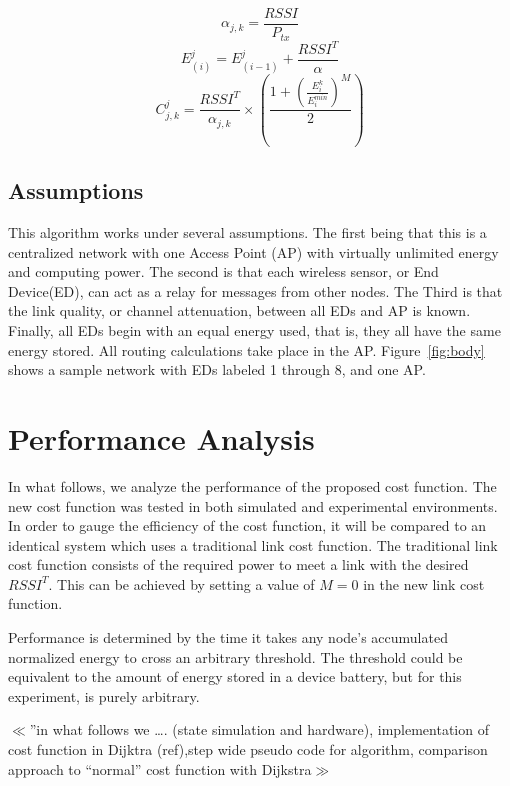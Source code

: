 \documentclass{article}
\begin{document}
\begin{equation}
\label{eqn:alpha}
\alpha_{j,k} = \frac{RSSI}{P_{tx}}
\end{equation}
\begin{equation}
\label{eqn:accumulated_energy}
E^j_{(i)} = E^j_{(i-1)} + \frac{RSSI^T}{\alpha}
\end{equation}
\begin{equation}
\label{eqn:link_cost}
C^j_{j,k} = \frac{RSSI^T}{\alpha_{j,k}} \times \left( \frac{1+\left(\frac{E^k_i}{E^{min}_{i}} \right)^M}{2} \right)
\end{equation}

\subsection{Assumptions}
This algorithm works under several assumptions. The first being that this is a centralized network with one Access Point (AP) with virtually unlimited energy and computing power. The second is that each wireless sensor, or End Device(ED), can act as a relay for messages from other nodes. The Third is that the link quality, or channel attenuation, between all EDs and AP is known. Finally, all EDs begin with an equal energy used, that is, they all have the same energy stored. All routing calculations take place in the AP. Figure~\ref{fig:body} shows a sample network with EDs labeled 1 through 8, and one AP.

\section{Performance Analysis}
In what follows, we analyze the performance of the proposed cost function. The new cost function was tested in both simulated and experimental environments. In order to gauge the efficiency of the cost function, it will be compared to an identical system which uses a traditional link cost function. The traditional link cost function consists of the required power to meet a link with the desired $RSSI^T$. This can be achieved by setting a value of $M=0$ in the new link cost function.

Performance is determined by the time it takes any node's accumulated normalized energy to cross an arbitrary threshold. The threshold could be equivalent to the amount of energy stored in a device battery, but for this experiment, is purely arbitrary. 

$\ll$”in what follows we …. (state simulation and hardware), implementation of cost function in Dijktra (ref),step wide pseudo code for algorithm, comparison approach to “normal” cost function with Dijkstra$\gg$
\end{document}
